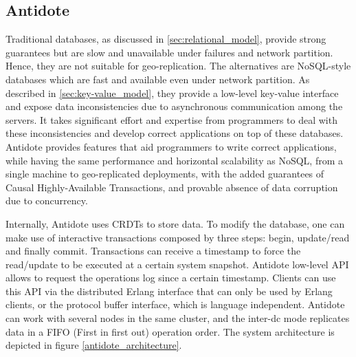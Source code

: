 \subsection{Antidote}
\label{sec:antidote_intro}
Traditional databases, as discussed in \ref{sec:relational_model}, provide strong guarantees but are slow and unavailable under failures and network partition. Hence, they are not suitable for geo-replication. The alternatives are NoSQL-style databases which are fast and available even under network partition. As described in \ref{sec:key-value_model}, they provide a low-level key-value interface and expose data inconsistencies due to asynchronous communication among the servers. It takes significant effort and expertise from programmers to deal with these inconsistencies and develop correct applications on top of these databases. Antidote\cite{site_antidote} provides features that aid programmers to write correct applications, while having the same performance and horizontal scalability as NoSQL, from a single machine to geo-replicated deployments, with the added guarantees of Causal Highly-Available Transactions, and provable absence of data corruption due to concurrency.\par
	Internally, Antidote uses CRDTs to store data. To modify the database, one can make use of interactive transactions composed by three steps: begin, update/read and finally commit. Transactions can receive a timestamp to force the read/update to be executed at a certain system snapshot. Antidote low-level API allows to request the operations log since a certain timestamp. Clients can use this API via the distributed Erlang interface that can only be used by Erlang clients, or the protocol buffer interface\cite{protocol_buffers}, which is language independent. Antidote can work with several nodes in the same cluster, and the inter-dc mode replicates data in a FIFO (First in first out) operation order. The system architecture is depicted in figure \ref{antidote_architecture}.

